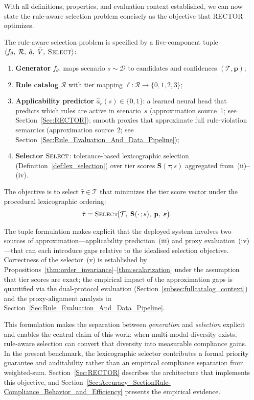 With all definitions, properties, and evaluation context established, we can now state the rule-aware selection problem concisely as the objective that RECTOR optimizes.

\begin{problem}
\label{prob:selection}
The rule-aware selection problem is specified by a five-component tuple
$\langle f_\theta,\; \mathcal{R},\; \hat{a},\; \bar{V},\; \textsc{Select}\rangle$:
\begin{enumerate}[label=(\roman*),leftmargin=2em]
\item \textbf{Generator} $f_\theta$: maps scenario $s\sim\mathcal{D}$ to candidates and confidences $(\mathcal{T},\mathbf{p})$;
\item \textbf{Rule catalog} $\mathcal{R}$ with tier mapping
  $\ell\colon\mathcal{R}\to\{0,1,2,3\}$;
\item \textbf{Applicability predictor} $\hat{a}_r(s)\in\{0,1\}$: a learned neural head that predicts which rules are active in scenario~$s$
  (approximation source~1; see Section~\ref{Sec:RECTOR}); smooth proxies that approximate full rule-violation semantics
  (approximation source~2; see Section~\ref{Sec:Rule_Evaluation_And_Data_Pipeline});
\item \textbf{Selector} $\textsc{Select}$: tolerance-based lexicographic selection (Definition~\ref{def:lex_selection}) over tier scores $\mathbf{S}(\tau;s)$ aggregated from~(ii)--(iv).
\end{enumerate}
The objective is to select $\hat{\tau}\in\mathcal{T}$ that minimizes the tier score vector under the procedural lexicographic ordering:
\begin{equation}
\hat{\tau}=\textsc{Select}\!\big(\mathcal{T},\;\mathbf{S}(\cdot\,;s),\;\mathbf{p},\;\boldsymbol{\varepsilon}\big).
\end{equation}
\end{problem}

\noindent
The tuple formulation makes explicit that the deployed system involves two sources of approximation---applicability prediction~(iii) and proxy evaluation~(iv)---that can each introduce gaps relative to the idealised selection objective.  Correctness of the selector~(v) is established by Propositions~\ref{thm:order_invariance}--\ref{thm:scalarization} under the assumption that tier scores are exact; the empirical impact of the approximation gaps is quantified via the dual-protocol evaluation (Section~\ref{subsec:fullcatalog_context}) and the proxy-alignment analysis in Section~\ref{Sec:Rule_Evaluation_And_Data_Pipeline}.

This formulation makes the separation between \emph{generation} and \emph{selection} explicit and enables the central claim of this work: when multi-modal diversity exists, rule-aware selection can convert that diversity into measurable compliance gains.  In the present benchmark, the lexicographic selector contributes a formal priority guarantee and auditability rather than an empirical compliance separation from weighted-sum.  Section~\ref{Sec:RECTOR} describes the architecture that implements this objective, and Section~\ref{Sec:Accuracy_SectionRule-Compliance_Behavior_and_Efficiency}
presents the empirical evidence.